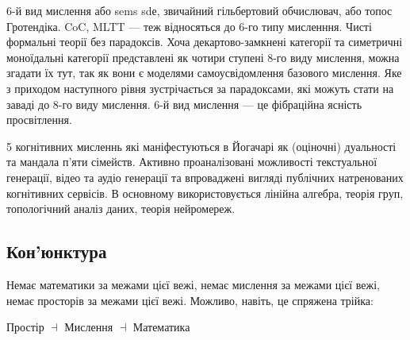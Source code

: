 6-й вид мислення або sems sdе, звичайний гільбертовий обчислювач, або топос Гротендіка.
CoC, MLTT — теж відносяться до 6-го типу мисленння. Чисті формальні теорії без парадоксів.
Хоча декартово-замкнені категорії та симетричні моноїдальні категорії представлені як чотири
ступені 8-го виду мислення, можна згадати їх тут, так як вони є моделями самоусвідомлення
базового мислення. Яке з приходом наступного рівня зустрічається за парадоксами, які можуть
стати на заваді до 8-го виду мислення. 6-й вид мислення --- це фібраційна ясність просвітлення.

5 когнітивних мисленнь які маніфестуються в Йогачарі як (оціночні) дуальності та мандала
п'яти сімейств. Активно проаналізовані можливості текстуальної генерації, відео та аудіо
генерації та впроваджені вигляді публічних натренованих когнітивних сервісів. В основному
використовується лінійна алгебра, теорія груп, топологічний аналіз даних, теорія нейромереж.

\subsection*{Кон'юнктура}

Немає математики за межами цієї вежі, немає мислення за межами цієї вежі, немає просторів
за межами цієї вежі. Можливо, навіть, це спряжена трійка:
\begin{center}Простір $\dashv$ Мислення $\dashv$ Математика\end{center}
